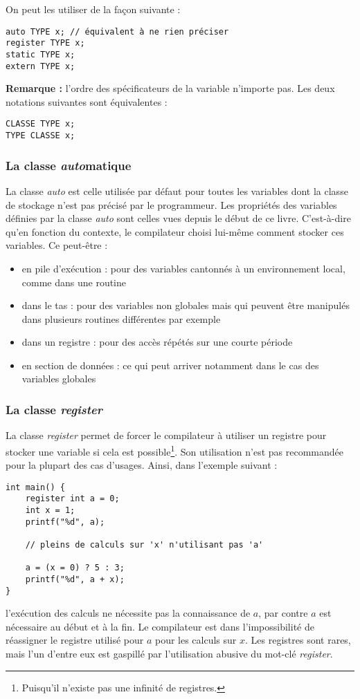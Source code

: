 \documentclass[../../../main.tex]{subfiles}
\begin{document}
On peut les utiliser de la façon suivante :
\begin{verbatim}
auto TYPE x; // équivalent à ne rien préciser
register TYPE x;
static TYPE x;
extern TYPE x;
\end{verbatim}
\textbf{Remarque :} l'ordre des spécificateurs de la variable n'importe pas. Les deux notations suivantes sont équivalentes :
\begin{verbatim}
CLASSE TYPE x;
TYPE CLASSE x;
\end{verbatim}
\subsubsection{La classe \textit{auto}matique}
\label{ssub:la_classe_auto}
La classe \textit{auto} est celle utilisée par défaut pour toutes les variables dont la classe de stockage n'est pas précisé par le programmeur. Les propriétés des variables définies par la classe \textit{auto} sont celles vues depuis le début de ce livre. C'est-à-dire qu'en fonction du contexte, le compilateur choisi lui-même comment stocker ces variables. Ce peut-être : 
\begin{itemize}
	\item en pile d'exécution : pour des variables cantonnés à un environnement local, comme dans une routine
	\item dans le tas : pour des variables non globales mais qui peuvent être manipulés dans plusieurs routines différentes par exemple
	\item dans un registre : pour des accès répétés sur une courte période
	\item en section de données : ce qui peut arriver notamment dans le cas des variables globales
\end{itemize}
\subsubsection{La classe \textit{register}}
\label{ssub:la_classe_register}
La classe \textit{register} permet de forcer le compilateur à utiliser un registre pour stocker une variable si cela est possible\footnote{Puisqu'il n'existe pas une infinité de registres.}. Son utilisation n'est pas recommandée pour la plupart des cas d'usages. Ainsi, dans l'exemple suivant :
\begin{verbatim}
int main() {
	register int a = 0;
	int x = 1;
	printf("%d", a);
	
	// pleins de calculs sur 'x' n'utilisant pas 'a'
	
	a = (x = 0) ? 5 : 3;
	printf("%d", a + x);
}
\end{verbatim}
l'exécution des calculs ne nécessite pas la connaissance de $a$, par contre $a$ est nécessaire au début et à la fin. Le compilateur est dans l'impossibilité de réassigner le registre utilisé pour $a$ pour les calculs sur $x$. Les registres sont rares, mais l'un d'entre eux est gaspillé par l'utilisation abusive du mot-clé \textit{register}. 
\end{document}
